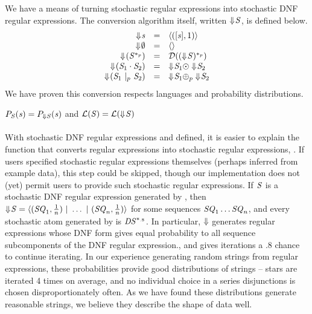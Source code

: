 \documentclass[acmsmall,screen,anonymous]{acmart}
\begin{document}
We have a means of turning stochastic regular expressions into stochastic DNF
regular expressions. The conversion algorithm itself, written
$\Downarrow\mkern-4mu \mathit{S}$, is defined below.
\[
  \begin{array}{rcl}
    \ToDNFRegexOf{\String} & = & \DNFOf{(\SequenceOf{\String},1)}\\
    \ToDNFRegexOf{\emptyset} & = & \DNFOf{}\\
    \ToDNFRegexOf{(\PRegexStar{\Regex}{\Probability})} & = & \AtomToDNFOf{\PRegexStar{(\ToDNFRegexOf{\Regex})}{\Probability}}\\
    \ToDNFRegexOf{(\RegexConcat{\Regex_1}{\Regex_2})} & = & \ToDNFRegexOf{\Regex_1} \ConcatDNF \ToDNFRegexOf{\Regex_2}\\
    \ToDNFRegexOf{(\PRegexOr{\Regex_1}{\Regex_2}{\Probability})} & = & \ToDNFRegexOf{\Regex_1} \OrDNF_{\Probability} \ToDNFRegexOf{\Regex_2}\\
  \end{array}
\]
We have proven this conversion respects languages and probability
distributions.

\begin{theorem}
  $P_{\mathit{S}}(\mathit{s}) = P_{\Downarrow
    \mathit{S}}(\mathit{s})$ and $\mathcal{L}(\mathit{S}) =
  \mathcal{L}(\Downarrow\mkern-4mu \mathit{S})$
\end{theorem}

\paragraph*{\ToStochastic} With stochastic DNF regular expressions and
\ToDNFRegex defined, it is easier to explain the function that converts regular
expressions into stochastic regular expressions, \ToStochastic. If users
specified stochastic regular expressions themselves (perhaps inferred from
example data), this step could be skipped,
though our implementation does not (yet) permit users to provide such
stochastic regular expressions. If $\mathit{S}$ is a stochastic DNF regular
expression generated by \ToStochastic, then $\Downarrow\mkern-4mu \mathit{S} =
\langle(\mathit{SQ}_1,\frac{1}{n}) ~|~ \ldots ~|~
  (\mathit{SQ}_n,\frac{1}{n})\rangle$ for some sequences $\mathit{SQ}_1\ldots\mathit{SQ}_n$,
and every stochastic atom generated by \ToStochastic is
$\mathit{DS}^{*_{.8}}$. In particular, $\Downarrow$ generates regular
expressions whose DNF form gives equal probability to all sequence subcomponents
of the DNF regular expression., and gives iterations a .8 chance to continue
iterating. In our experience generating random strings from regular expressions,
these probabilities provide good distributions of strings -- stars are iterated
4 times on average, and no individual choice in a series disjunctions is chosen
disproportionately often. As we have found these distributions generate
reasonable strings, we believe they describe the shape of data well.
\end{document}
